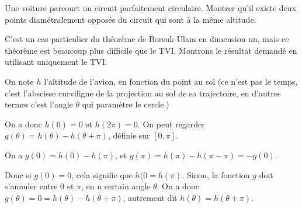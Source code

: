 \begin{exo}
Une voiture  parcourt un circuit parfaitement circulaire. Montrer qu'il existe deux points  diamétralement opposés du circuit qui sont à la même altitude. 
\begin{sol}
C'est un cas particulier du théorème de Borsuk-Ulam en dimension un, mais ce théorème est beaucoup plus difficile que le TVI. Montrons le résultat demandé en utilisant uniquement le TVI.

On note $h$ l'altitude de l'avion, en fonction du point au sol (ce n'est pas le temps, c'est l'abscisse curviligne  de la projection au sol de sa trajectoire, en d'autres termes c'est l'angle $\theta$ qui paramètre le cercle.)

On a donc $h(0)=0$ et $h(2\pi)=0$. On peut regarder $g(\theta)=h(\theta)-h(\theta+\pi)$, définie sur $[0,\pi]$. 

On a $g(0)=h(0)-h(\pi)$, et $g(\pi)=h(\pi)-h(\pi-\pi) = -g(0)$.

Donc si $g(0)=0$, cela signifie que $h(0=h(\pi)$. Sinon, la fonction $g$ doit s'annuler entre $0$ et $\pi$, en u certain angle $\theta$. On a donc $g(\theta)=0=h(\theta)-h(\theta+\pi)$, autrement dit $h(\theta)=h(\theta+\pi)$.
\end{sol}
\end{exo}


